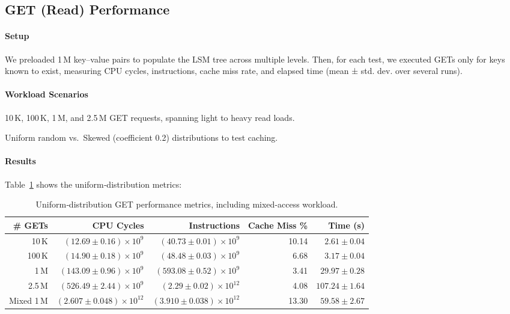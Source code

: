 \documentclass[10pt]{article}
\begin{document}
\subsection{GET (Read) Performance}

\paragraph{Setup}
We preloaded 1\,M key–value pairs to populate the LSM tree across multiple levels. Then, for each test, we executed GETs only for keys known to exist, measuring CPU cycles, instructions, cache miss rate, and elapsed time (mean ± std. dev. over several runs).

\paragraph{Workload Scenarios}
\begin{description}[leftmargin=1em,labelwidth=*,itemsep=0.5ex]
  \item[Query Volume] 10\,K, 100\,K, 1\,M, and 2.5\,M GET requests, spanning light to heavy read loads.
  \item[Access Skew] Uniform random vs.\ Skewed (coefficient 0.2) distributions to test caching.
\end{description}

\paragraph{Results}
Table~\ref{tab:get_read_perf} shows the uniform‐distribution metrics:

\begin{table}[htbp]
  \centering
  \small
  \begin{tabular}{r r r r r}
    \toprule
    \# GETs     & CPU Cycles                        & Instructions                         & Cache Miss \% & Time (s)         \\
    \midrule
    10\,K       & $(12.69\pm0.16)\times10^9$        & $(40.73\pm0.01)\times10^9$           & 10.14         & $2.61\pm0.04$    \\
    100\,K      & $(14.90\pm0.18)\times10^9$        & $(48.48\pm0.03)\times10^9$           & 6.68          & $3.17\pm0.04$    \\
    1\,M        & $(143.09\pm0.96)\times10^9$       & $(593.08\pm0.52)\times10^9$          & 3.41          & $29.97\pm0.28$   \\
    2.5\,M      & $(526.49\pm2.44)\times10^9$       & $(2.29\pm0.02)\times10^{12}$         & 4.08          & $107.24\pm1.64$  \\
    Mixed 1\,M  & $(2.607\pm0.048)\times10^{12}$    & $(3.910\pm0.038)\times10^{12}$       & 13.30         & $59.58\pm2.67$   \\
    \bottomrule
  \end{tabular}
  \caption{Uniform‐distribution GET performance metrics, including mixed‐access workload.}
  \label{tab:get_read_perf}
\end{table}
\end{document}
